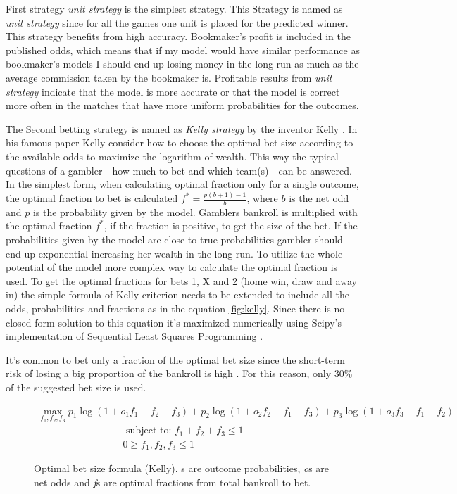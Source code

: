 First strategy \textit{unit strategy} is the simplest strategy. This Strategy is named as \textit{unit strategy} since for all the games one unit is placed for the predicted winner. This strategy benefits from high accuracy. Bookmaker's profit is included in the published odds, which means that if my model would have similar performance as bookmaker's models I should end up losing money in the long run as much as the average commission taken by the bookmaker is. Profitable results from \textit{unit strategy} indicate that the model is more accurate or that the model is correct more often in the matches that have more uniform probabilities for the outcomes.

The Second betting strategy is named as \textit{Kelly strategy} by the inventor Kelly \cite{kelly2011new}. In his famous paper \cite{kelly2011new} Kelly consider how to choose the optimal bet size according to the available odds to maximize the logarithm of wealth. This way the typical questions of a gambler - how much to bet and which team(s) -  can be answered. In the simplest form, when calculating optimal fraction only for a single outcome, the optimal fraction to bet is calculated $f ^ { * } =  \frac { p ( b + 1 ) - 1 } { b }$, where $b$ is the net odd and $p$ is the probability given by the model. Gamblers bankroll is multiplied with the optimal fraction $f^{*}$, if the fraction is positive, to get the size of the bet. If the probabilities given by the model are close to true probabilities gambler should end up exponential increasing her wealth in the long run. To utilize the whole potential of the model more complex way to calculate the optimal fraction is used. To get the optimal fractions for bets 1, X and 2 (home win, draw and away in) the simple formula of Kelly criterion needs to be extended to include all the odds, probabilities and fractions as in the equation \ref{fig:kelly}. Since there is no closed form solution to this equation it's maximized numerically using Scipy's implementation of Sequential Least Squares Programming \cite{scipy}.

It's common to bet only a fraction of the optimal bet size since the short-term risk of losing a big proportion of the bankroll is high \cite{maclean2011medium}. For this reason, only 30\% of the suggested bet size is used.
\begin{figure}
    \caption{Optimal bet size formula (Kelly). s are outcome probabilities, \textit{o}s are net odds and \textit{f}s are optimal fractions from total bankroll to bet. }
     \begin{align*}
     \max_{f_1, f_2, f_3} p_1  \log(1 + o_1 f_1 - f_2 - f_3) + p_2 \log(1 + o_2 f_2 - f_1 - f_3) + p_3 \log(1 + o_3 f_3 - f_1 - f_2)
    \end{align*}
    \begin{align*}
        \text { subject to: }  f_1 + f_2 + f_3 \leq 1 \\
         0 \geq f_1, f_2, f_3 \leq 1
    \end{align*}
    \label{eq:kelly}
\end{figure}


